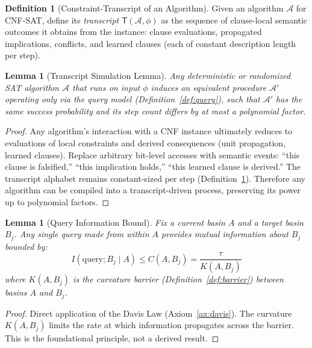 \documentclass[11pt,a4paper]{article}
\theoremstyle{plain}
\newtheorem{lemma}[theorem]{Lemma}
\theoremstyle{definition}
\newtheorem{definition}[theorem]{Definition}
\theoremstyle{remark}
\begin{document}
\begin{definition}[Constraint-Transcript of an Algorithm]
\label{def:transcript}
Given an algorithm $\mathcal{A}$ for CNF-SAT, define its \emph{transcript} $\mathsf{T}(\mathcal{A},\phi)$
as the sequence of clause-local semantic outcomes it obtains from the instance:
clause evaluations, propagated implications, conflicts, and learned clauses (each of constant description length per step).
\end{definition}

\begin{lemma}[Transcript Simulation Lemma]
\label{lem:transcript-sim}
Any deterministic or randomized SAT algorithm $\mathcal{A}$ that runs on input $\phi$ induces an equivalent
procedure $\mathcal{A}'$ operating only via the query model (Definition~\ref{def:query}),
such that $\mathcal{A}'$ has the same success probability and its step count differs by at most a polynomial factor.
\end{lemma}

\begin{proof}
Any algorithm's interaction with a CNF instance ultimately reduces to evaluations of local constraints and derived consequences (unit propagation, learned clauses).
Replace arbitrary bit-level accesses with semantic events: ``this clause is falsified,'' ``this implication holds,'' ``this learned clause is derived.''
The transcript alphabet remains constant-sized per step (Definition~\ref{def:transcript}).
Therefore any algorithm can be compiled into a transcript-driven process, preserving its power up to polynomial factors.
\end{proof}

\begin{lemma}[Query Information Bound]
\label{lem:query-info}
Fix a current basin $A$ and a target basin $B_j$. Any single query made from within $A$ provides mutual information about $B_j$ bounded by:
\begin{equation}
    I(\text{query}; B_j \mid A) \leq C(A,B_j) = \frac{\tau}{K(A,B_j)}
\end{equation}
where $K(A,B_j)$ is the curvature barrier (Definition~\ref{def:barrier}) between basins $A$ and $B_j$.
\end{lemma}

\begin{proof}
Direct application of the Davis Law (Axiom~\ref{ax:davis}). The curvature $K(A,B_j)$ limits the rate at which information propagates across the barrier. This is the foundational principle, not a derived result.
\end{proof}
\end{document}
